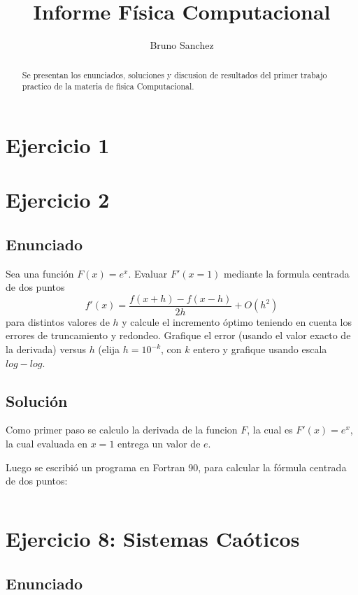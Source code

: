 \documentclass[a4paper,10pt]{report}
\title{Informe F\'isica Computacional }
\author{Bruno Sanchez}
\begin{document}
\maketitle

\begin{abstract}
Se presentan los enunciados, soluciones y discusion de resultados del primer trabajo practico
de la materia de fisica Computacional.
\end{abstract}

\section{Ejercicio 1}

\section{Ejercicio 2}

\subsection{Enunciado}
Sea una funci\'on $F(x) = e^x$. Evaluar $F'(x=1)$ mediante la formula centrada de dos puntos 
 \begin{displaymath}
 f'(x) = \frac{f(x+h) - f(x-h)}{2h} + O(h^2)
 \end{displaymath} 
 para distintos valores de $h$ y calcule el incremento \'optimo teniendo en cuenta los errores de truncamiento y redondeo. 
 Grafique el error (usando el valor exacto de la derivada) versus $h$ (elija $h=10^{-k}$, con $k$ entero y grafique usando
 escala $log-log$.
 
\subsection{Soluci\'on}
Como primer paso se calculo la derivada de la funcion $F$, la cual es $F'(x)=e^x$, la cual evaluada en $x=1$ entrega un
valor de $e$. 

Luego se escribi\'o un programa en Fortran 90, para calcular la f\'ormula centrada de dos puntos:
\inputminted[firstline=22]{fortran}{../2/lab1_2.f90}

\section{Ejercicio 8: Sistemas Ca\'oticos}
\subsection{Enunciado}
\end{document}
